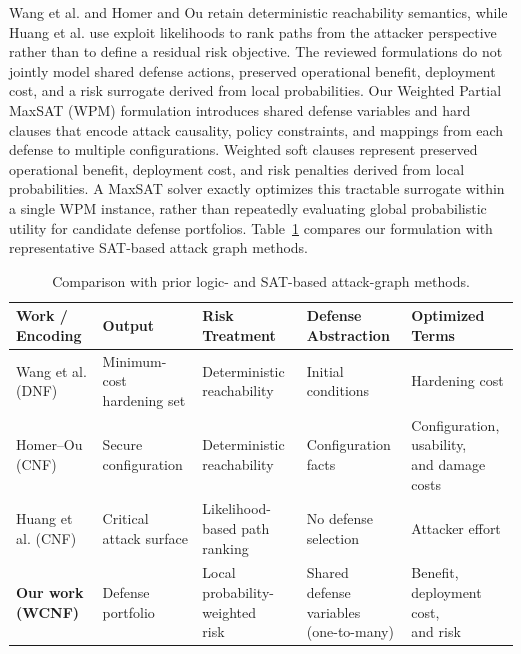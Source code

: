 \documentclass[conference]{IEEEtran}
\theoremstyle{definition} %
\theoremstyle{plain} %
\begin{document}
{Wang et al. and Homer and Ou retain deterministic reachability semantics, while Huang et al. use exploit likelihoods to rank paths from the attacker perspective rather than to define a residual risk objective. The reviewed formulations do not jointly model shared defense actions, preserved operational benefit, deployment cost, and a risk surrogate derived from local probabilities. Our Weighted Partial MaxSAT (WPM) formulation introduces shared defense variables and hard clauses that encode attack causality, policy constraints, and mappings from each defense to multiple configurations. Weighted soft clauses represent preserved operational benefit, deployment cost, and risk penalties derived from local probabilities. A MaxSAT solver exactly optimizes this tractable surrogate within a single WPM instance, rather than repeatedly evaluating global probabilistic utility for candidate defense portfolios. Table~\ref{tab} compares our formulation with representative SAT-based attack graph methods.
\begin{table}[t]
\centering
\caption{Comparison with prior logic- and SAT-based attack-graph methods.}
\label{tab}
\footnotesize
\setlength{\tabcolsep}{3pt}
\renewcommand{\arraystretch}{1.12}

\begin{tabular}{
@{}
>{\raggedright\arraybackslash}m{3.25cm}
>{\raggedright\arraybackslash}m{2.90cm}
>{\raggedright\arraybackslash}m{3.40cm}
>{\raggedright\arraybackslash}m{3.40cm}
>{\raggedright\arraybackslash}m{3.20cm}
@{}
}
\toprule
\textbf{Work / Encoding} &
\textbf{Output} &
\textbf{Risk Treatment} &
\textbf{Defense Abstraction} &
\textbf{Optimized Terms} \\
\midrule

Wang et al. (DNF) \cite{wang2006minimum} &
\makecell[l]{Minimum-cost\\hardening set} &
Deterministic reachability &
Initial conditions &
Hardening cost \\

\addlinespace[2pt]

Homer--Ou (CNF) \cite{homer2009sat} &
Secure configuration &
Deterministic reachability &
Configuration facts &
\makecell[l]{Configuration, usability,\\and damage costs} \\

\addlinespace[2pt]

Huang et al. (CNF) \cite{huang2011distilling} &
Critical attack surface &
\makecell[l]{Likelihood-based path\\ranking} &
No defense selection &
Attacker effort \\

\midrule

\textbf{Our work (WCNF)} &
Defense portfolio &
\makecell[l]{Local probability-weighted\\risk} &
\makecell[l]{Shared defense variables\\(one-to-many)} &
\makecell[l]{Benefit, deployment cost,\\and risk} \\

\bottomrule
\end{tabular}
\end{table}

}
\end{document}
